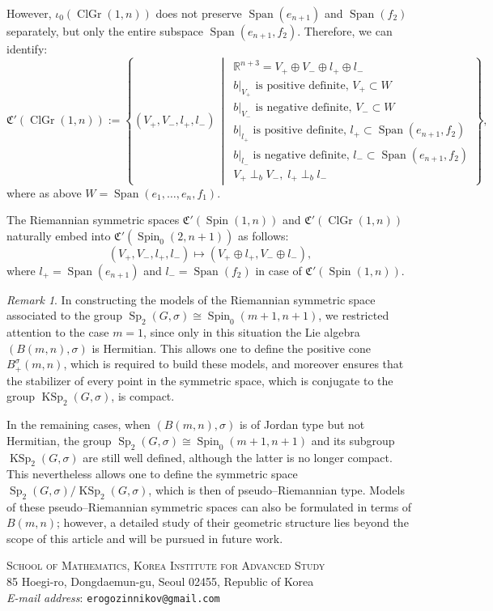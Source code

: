\documentclass[a4paper,oneside,11pt]{amsart}
\DeclareMathOperator{\Span}{Span}
\DeclareMathOperator{\Sp}{Sp}
\DeclareMathOperator{\ClGr}{ClGr}
\DeclareMathOperator{\Spin}{Spin}
\DeclareMathOperator{\KSp}{KSp}
\newcommand{\midwd}{\,\middle\vert\,}
\newcommand{\R}{\mathbb R}
\theoremstyle{plain}
\theoremstyle{definition}
\theoremstyle{remark}
\newtheorem{rem}[teo]{Remark}
\begin{document}
However, $\iota_0(\ClGr(1,n))$ does not preserve $\Span(e_{n+1})$ and $\Span(f_2)$ separately, but only the entire subspace $\Span(e_{n+1},f_2)$. Therefore, we can identify: 
$$\mathfrak C'(\ClGr(1,n)):=\left\{(V_+,V_-,l_+,l_-)\midwd \begin{array}{l}
\R^{n+3}=V_+\oplus V_-\oplus l_+\oplus l_-\\
b|_{V_+}\text{ is positive definite, }V_+\subset W\\
b|_{V_-}\text{ is negative definite, }V_-\subset W\\
b|_{l_+}\text{ is positive definite, }l_+\subset \Span(e_{n+1},f_2)\\
b|_{l_-}\text{ is negative definite, }l_-\subset \Span(e_{n+1},f_2)\\
V_+\perp_b V_-,\;l_+\perp_b l_-
\end{array}\right\},$$
where as above $W=\Span(e_1,\dots,e_n,f_1)$.

The Riemannian symmetric spaces $\mathfrak C'(\Spin(1,n))$ and $\mathfrak C'(\ClGr(1,n))$ naturally embed into $\mathfrak C'(\Spin_0(2,n+1))$ as follows: 
$$(V_+,V_-,l_+,l_-)\mapsto (V_+\oplus l_+, V_-\oplus l_-),$$
where $l_+=\Span(e_{n+1})$ and $l_-=\Span(f_2)$ in case of $\mathfrak C'(\Spin(1,n))$.

\begin{rem}
In constructing the models of the Riemannian symmetric space associated to the group 
$\Sp_2(G,\sigma)\cong \Spin_0(m+1,n+1)$, we restricted attention to the case $m=1$, 
since only in this situation the Lie algebra $(B(m,n),\sigma)$ is Hermitian. 
This allows one to define the positive cone $B^\sigma_+(m,n)$, which is required to build 
these models, and moreover ensures that the stabilizer of every point in the symmetric space, 
which is conjugate to the group $\KSp_2(G,\sigma)$, is compact. 

In the remaining cases, when $(B(m,n),\sigma)$ is of Jordan type but not Hermitian, 
the group $\Sp_2(G,\sigma)\cong \Spin_0(m+1,n+1)$ and its subgroup 
$\KSp_2(G,\sigma)$ are still well defined, although the latter is no longer compact. 
This nevertheless allows one to define the symmetric space 
$\Sp_2(G,\sigma)/\KSp_2(G,\sigma)$, which is then of pseudo--Riemannian type. 
Models of these pseudo--Riemannian symmetric spaces can also be formulated in terms of 
$B(m,n)$; however, a detailed study of their geometric structure lies beyond the scope of this article and will be pursued in future work.
\end{rem}




\bigskip

\noindent\small{\textsc{School of Mathematics, Korea Institute for Advanced Study}\\
  85 Hoegi-ro, Dongdaemun-gu, Seoul 02455, Republic of Korea}\\
\emph{E-mail address}:  \texttt{erogozinnikov@gmail.com}

\bigskip
\end{document}
